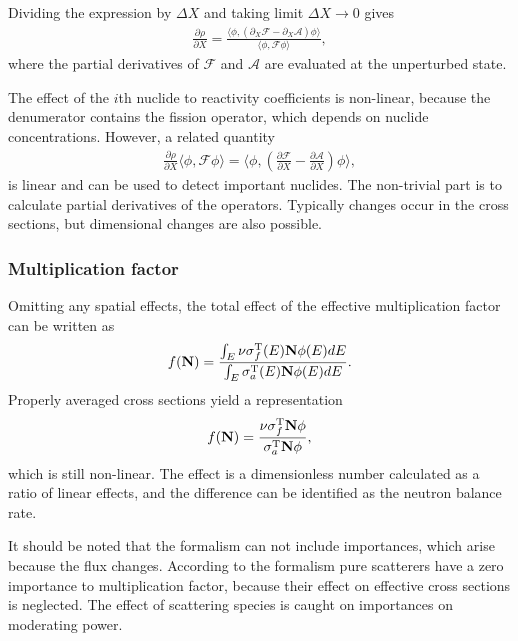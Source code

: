 Dividing the expression by $\Delta X$ and taking limit $\Delta X\to 0$ gives
%
\begin{gather}
\frac{\partial\rho}{\partial X} = \frac{
\langle \phi, (\partial_X \mathcal{F}-\partial_X \mathcal{A})\phi\rangle
}{
\langle \phi, \mathcal{F}\phi\rangle
}
,
\end{gather}
%
where the partial derivatives of $\mathcal{F}$ and $\mathcal{A}$ are evaluated at the unperturbed state.

The effect of the $i$th nuclide to reactivity coefficients is non-linear, because the denumerator contains the fission operator, which depends on nuclide concentrations. However, a related quantity
%
\begin{gather}
\frac{\partial\rho}{\partial X}\langle \phi, \mathcal{F}\phi\rangle = \langle \phi, (\frac{\partial\mathcal{F}}{\partial X}-\frac{\partial\mathcal{A}}{\partial X})\phi\rangle
,
\end{gather}
%
is linear and can be used to detect important nuclides. The non-trivial part is to calculate partial derivatives of the operators. Typically changes occur in the cross sections, but dimensional changes are also possible.




\subsubsection*{Multiplication factor}

Omitting any spatial effects, the total effect of the effective multiplication factor can be written as
%
\begin{gather}
f(\mathbf{N}) 
= \frac{\int_E\mathbf{\nu\sigma}_f^{\mathrm{T}}(E)\mathbf{N}\phi(E)dE}{\int_E\mathbf{\sigma}_a^{\mathrm{T}}(E)\mathbf{N}\phi(E)dE}.
\end{gather}
%
Properly averaged cross sections yield a representation
%
\begin{gather}
f(\mathbf{N}) = \frac{\mathbf{\nu\sigma}_f^{\mathrm{T}}\mathbf{N}\phi}{\mathbf{\sigma}_a^{\mathrm{T}}\mathbf{N}\phi},
\end{gather}
%
which is still non-linear. The effect is a dimensionless number calculated as a ratio of linear effects, and the difference can be identified as the neutron balance rate.

It should be noted that the formalism can not include importances, which arise because the flux changes. According to the formalism pure scatterers have a zero importance to multiplication factor, because their effect on effective cross sections is neglected. The effect of scattering species is caught on importances on moderating power.

